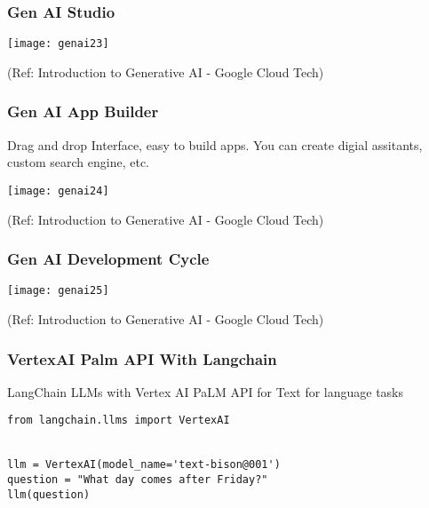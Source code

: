 \begin{frame}[fragile]\frametitle{Gen AI Studio}

\begin{center}
\texttt{[image: genai23]}
\end{center}


{\tiny (Ref: Introduction to Generative AI - Google Cloud Tech)}

\end{frame}


\begin{frame}[fragile]\frametitle{Gen AI App Builder}

Drag and drop Interface, easy to build apps. You can create digial assitants, custom search engine, etc.

\begin{center}
\texttt{[image: genai24]}
\end{center}


{\tiny (Ref: Introduction to Generative AI - Google Cloud Tech)}

\end{frame}

\begin{frame}[fragile]\frametitle{Gen AI Development Cycle}

\begin{center}
\texttt{[image: genai25]}
\end{center}


{\tiny (Ref: Introduction to Generative AI - Google Cloud Tech)}

\end{frame}

\begin{frame}[fragile]\frametitle{VertexAI Palm API With Langchain}

LangChain LLMs with Vertex AI PaLM API for Text for language tasks

\begin{lstlisting}
from langchain.llms import VertexAI


llm = VertexAI(model_name='text-bison@001')
question = "What day comes after Friday?"
llm(question)
\end{lstlisting}

\end{frame}

